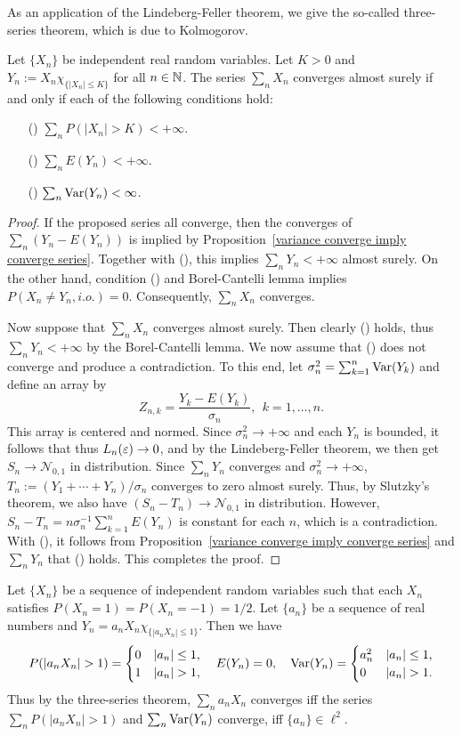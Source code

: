 As an application of the Lindeberg-Feller theorem, we give the so-called three-series theorem, which is due to Kolmogorov.
\begin{theorem}
Let $\{X_n\}$ be independent real random variables. Let $K>0$ and $Y_n:=X_n\chi_{\{|X_n|\leq K\}}$ for all $n\in\mathbb{N}$. The series $\sum_{n}X_n$ converges almost surely if and only if each of the following conditions hold:
\begin{itemize}
\item[(\rmnum{1})] $\sum_nP(|X_n|>K)<+\infty$.
\item[(\rmnum{2})] $\sum_nE(Y_n)<+\infty$.
\item[(\rmnum{3})] $\sum_n\mathrm{Var}(Y_n)<\infty$.
\end{itemize}
\end{theorem}
\begin{proof}
If the proposed series all converge, then the converges of $\sum_n(Y_n-E(Y_n))$ is implied by Proposition~\ref{variance converge imply converge series}. Together with (), this implies $\sum_nY_n<+\infty$ almost surely. On the other hand, condition () and Borel-Cantelli lemma implies $P(X_n\neq Y_n,i.o.)=0$. Consequently, $\sum_nX_n$ converges.\par
Now suppose that $\sum_nX_n$ converges almost surely. Then clearly () holds, thus $\sum_nY_n<+\infty$ by the Borel-Cantelli lemma. We now assume that () does not converge and produce a contradiction. To this end, let $\sigma_n^2=\sum_{k=1}^{n}\mathrm{Var}(Y_k)$ and define an array by
\[Z_{n,k}=\frac{Y_k-E(Y_k)}{\sigma_n},\ \ k=1,\dots,n.\]
This array is centered and normed. Since $\sigma_n^2\to+\infty$ and each $Y_n$ is bounded, it follows that thus $L_n(\varepsilon)\to 0$, and by the Lindeberg-Feller theorem, we then get $S_n\to\mathcal{N}_{0,1}$ in distribution. Since $\sum_nY_n$ converges and $\sigma_n^2\to+\infty$, $T_n:=(Y_1+\cdots+Y_n)/\sigma_n$ converges to zero almost surely. Thus, by Slutzky's theorem, we also have $(S_n-T_n)\to\mathcal{N}_{0,1}$ in distribution. However, $S_n-T_n=n\sigma_n^{-1}\sum_{k=1}^{n}E(Y_n)$ is constant for each $n$, which is a contradiction. With (), it follows from Proposition~\ref{variance converge imply converge series} and $\sum_nY_n$ that () holds. This completes the proof.
\end{proof}
\begin{example}
Let $\{X_n\}$ be a sequence of independent random variables such that each $X_n$ satisfies $P(X_n=1)=P(X_n=-1)=1/2$. Let $\{a_n\}$ be a sequence of real numbers and $Y_n=a_nX_n\chi_{\{|a_nX_n|\leq 1\}}$. Then we have
\[P(|a_nX_n|>1)=\begin{cases}
0&|a_n|\leq 1,\\
1&|a_n|>1,
\end{cases}\quad E(Y_n)=0,\quad \Var(Y_n)=\begin{cases}
a_n^2&|a_n|\leq 1,\\
0&|a_n|>1.
\end{cases}\]
Thus by the three-series theorem, $\sum_na_nX_n$ converges iff the series $\sum_nP(|a_nX_n|>1)$ and $\sum_n\mathrm{Var}(Y_n)$ converge, iff $\{a_n\}\in\ell^2$.
\end{example}

